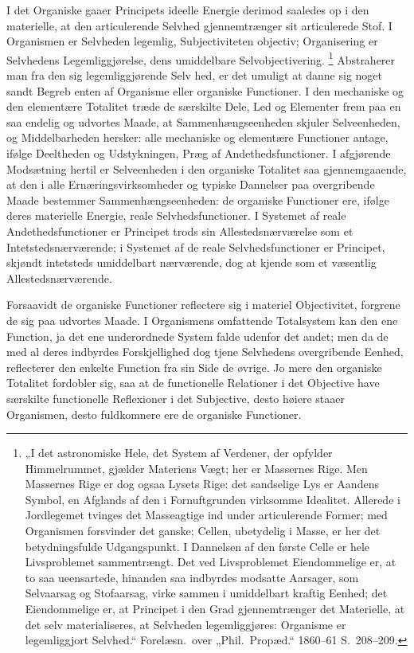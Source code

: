 \documentclass[12pt]{book}
\newcommand{\apage}[1]{\marginnote{\footnotesize\textit{[#1]}}}
\begin{document}
I det Organiske gaaer Principets ideelle Energie derimod saaledes op i den materielle, at den
articulerende Selvhed gjennemtrænger sit articulerede Stof. I Organismen er Selvheden legemlig,
Subjectiviteten objectiv; Organisering er Selvhedens Legemliggjørelse, dens umiddelbare
Selvobjectivering.%
\footnote{„I det astronomiske Hele, det System af Verdener, der opfylder Himmelrummet, gjælder
  Materiens Vægt; her er Massernes Rige. Men Massernes Rige er dog ogsaa Lysets Rige: det
  sandselige Lys er Aandens Symbol, en Afglands af den i Fornuftgrunden virksomme Idealitet.
  Allerede i Jordlegemet tvinges det Masseagtige ind under articulerende Former; med Organismen
  forsvinder det ganske; Cellen, ubetydelig i Masse, er her det betydningsfulde Udgangspunkt. I
  Dannelsen af den første Celle er hele Livsproblemet sammentrængt. Det ved Livsproblemet
  Eiendommelige er, at to saa ueensartede, hinanden saa indbyrdes modsatte Aarsager, som
  Selvaarsag og Stofaarsag, virke sammen i umiddelbart kraftig Eenhed; det Eiendommelige er, at
  Principet i den Grad gjennemtrænger det Materielle, at det selv materialiseres, at Selvheden
  legemliggjøres: Organisme er legemliggjort Selvhed.“ Forelæsn.\ over „Phil.\ Propæd.“ 1860--61
  S.~208--209.}
Abstraherer man fra den sig legemliggjørende Selv\-%
hed, \apage{404} er det umuligt at danne sig noget sandt Begreb enten af Organisme eller organiske
Functioner. I den mechaniske og den elementære Totalitet træde de særskilte Dele, Led og
Elementer frem paa en saa endelig og udvortes Maade, at Sammenhængseenheden skjuler Selveenheden,
og Middelbarheden hersker: alle mechaniske og elementære Functioner antage, ifølge Deeltheden og
Udstykningen, Præg af Andethedsfunctioner. I afgjørende Modsætning hertil er Selveenheden i den
organiske Totalitet saa gjennemgaaende, at den i alle Ernæringsvirksomheder og typiske Dannelser
paa overgribende Maade bestemmer Sammenhængseenheden: de organiske Functioner ere, ifølge deres
materielle Energie, reale Selvhedsfunctioner. I Systemet af reale Andethedsfunctioner er
Principet trods sin Allestedsnærværelse som et Intetstedsnærværende; i Systemet af de reale
Selvhedsfunctioner er Principet, skjøndt intetsteds umiddelbart nærværende, dog at kjende som et
væsentlig Allestedsnærværende.

Forsaavidt de organiske Functioner reflectere sig i materiel Objectivitet, forgrene de sig paa
udvortes Maade. I Organismens omfattende Totalsystem kan den ene Function, ja det ene
underordnede System falde udenfor det andet; men da de med al deres indbyrdes Forskjellighed dog
tjene Selvhedens overgribende Eenhed, reflecterer den enkelte Function fra sin Side de øvrige. Jo
mere den organiske Totalitet fordobler sig, saa at de functionelle Relationer i det Objective
have særskilte functionelle Reflexioner i det Subjective, desto høiere staaer Organismen, desto
fuldkomnere ere de organiske Functioner.
\end{document}
